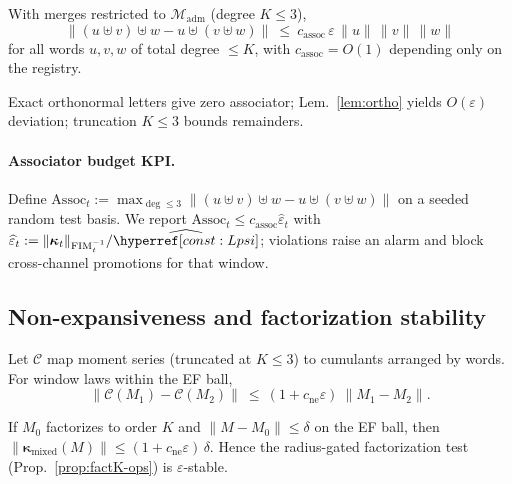 \begin{theorem}\label{thm:qshuffle-assoc}
\emph{}
With merges restricted to $\mathcal M_{\mathrm{adm}}$ (degree $K\le 3$),
\[
\big\|(u\uplus v)\uplus w - u\uplus (v\uplus w)\big\|
\ \le\ c_{\mathrm{assoc}}\,\varepsilon\,\|u\|\,\|v\|\,\|w\|
\]
for all words $u,v,w$ of total degree $\le K$, with $c_{\mathrm{assoc}}=O(1)$ depending only on the registry.
\begin{proofsketch}
Exact orthonormal letters give zero associator; Lem.~\ref{lem:ortho} yields $O(\varepsilon)$ deviation; truncation $K\le 3$ bounds remainders.
\end{proofsketch}
\end{theorem}

\paragraph{Associator budget KPI.}
Define $\mathrm{Assoc}_t:=\max_{\deg\le3}\|(u\uplus v)\uplus w-u\uplus(v\uplus w)\|$ on a seeded random test basis.
We report $\mathrm{Assoc}_t \le c_{\mathrm{assoc}}\widehat\varepsilon_t$ with $\widehat\varepsilon_t:=\|\bm\kappa_t\|_{\FIM_t^{-1}}/\widehat{\constref{Lpsi}}$; violations raise an alarm and block cross-channel promotions for that window.

\subsection*{Non-expansiveness and factorization stability}
\begin{proposition}\label{prop:nonexp}
\emph{}
Let $\mathcal C$ map moment series (truncated at $K\!\le\!3$) to cumulants arranged by words.
For window laws within the EF ball,
\[
\|\mathcal C(M_1)-\mathcal C(M_2)\| \ \le\ (1+c_{\mathrm{ne}}\varepsilon)\ \|M_1-M_2\|.
\]
\end{proposition}

\begin{corollary}\label{cor:fact-stab}
\emph{}
If $M_0$ factorizes to order $K$ and $\|M-M_0\|\le\delta$ on the EF ball, then
\(
\|\bm\kappa_{\mathrm{mixed}}(M)\|\le (1+c_{\mathrm{ne}}\varepsilon)\,\delta.
\)
Hence the radius-gated factorization test (Prop.~\ref{prop:factK-ops}) is $\varepsilon$-stable.
\end{corollary}

